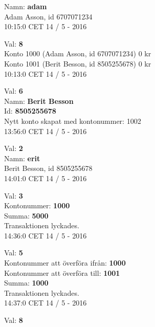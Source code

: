 \begin{multicols}{2}
\begin{exampleblock}
Namn: \textbf{adam}\\
Adam Asson, id 6707071234\\
10:15:0 CET 14 / 5 - 2016\\
\end{exampleblock}
\begin{exampleblock}
Val: \textbf{8}\\
Konto 1000 (Adam Asson, id 6707071234) 0 kr\\
Konto 1001 (Berit Besson, id 8505255678) 0 kr\\
10:13:0 CET 14 / 5 - 2016\\
\end{exampleblock}
\begin{exampleblock}
Val: \textbf{6}\\
Namn: \textbf{Berit Besson}\\
Id: \textbf{8505255678}\\
Nytt konto skapat med kontonummer: 1002\\
13:56:0 CET 14 / 5 - 2016\\
\end{exampleblock}
\begin{exampleblock}
Val: \textbf{2}\\
Namn: \textbf{erit}\\
Berit Besson, id 8505255678\\
14:01:0 CET 14 / 5 - 2016\\
\end{exampleblock}
\begin{exampleblock}
Val: \textbf{3}\\
Kontonummer: \textbf{1000}\\
Summa: \textbf{5000}\\
Transaktionen lyckades.\\
14:36:0 CET 14 / 5 - 2016\\
\end{exampleblock}
\begin{exampleblock}
Val: \textbf{5}\\
Kontonummer att överföra ifrån: \textbf{1000}\\
Kontonummer att överföra till: \textbf{1001}\\
Summa: \textbf{1000}\\
Transaktionen lyckades.\\
14:37:0 CET 14 / 5 - 2016\\
\end{exampleblock}
\begin{exampleblock}
Val: \textbf{8}\\

\end{exampleblock}
\end{multicols}
